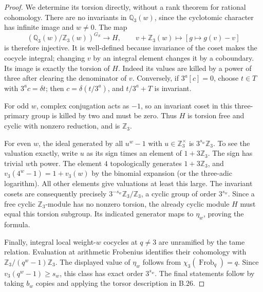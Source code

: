 \begin{proof}
We determine its torsion directly, without a rank
theorem for rational cohomology. There are no
invariants in $\mathbb Q_3(w)$, since the cyclotomic
character has infinite image and $w\ne0$. The map
\[
 (\mathbb Q_3(w)/\mathbb Z_3(w))^{G_S}
   \longrightarrow H,\qquad
 v+\mathbb Z_3(w)\longmapsto[g\mapsto g(v)-v]
\]
is therefore injective. It is well-defined because
invariance of the coset makes the cocycle integral;
changing $v$ by an integral element changes it by a
coboundary. Its image is exactly the torsion of $H$.
Indeed its values are killed by a power of three
after clearing the denominator of $v$. Conversely,
if $3^a[c]=0$, choose $t\in T$ with
$3^ac=\delta t$; then
$c=\delta(t/3^a)$, and $t/3^a+T$ is invariant.

For odd $w$, complex conjugation acts as $-1$,
so an invariant coset in this three-primary group
is killed by two and must be zero. Thus $H$ is
torsion free and cyclic with nonzero reduction,
and is $\mathbb Z_3$.

For even $w$, the ideal generated by all
$u^w-1$ with $u\in\mathbb Z_3^\times$ is
$3^{s_w}\mathbb Z_3$. To see the valuation exactly,
write $u$ as its sign times an element of
$1+3\mathbb Z_3$. The sign has trivial $w$th
power. The element $4$ topologically generates
$1+3\mathbb Z_3$, and
$v_3(4^w-1)=1+v_3(w)$ by the binomial expansion
(or the three-adic logarithm). All other elements
give valuations at least this large.
The invariant cosets are consequently precisely
$3^{-s_w}\mathbb Z_3/\mathbb Z_3$, a cyclic group
of order $3^{s_w}$. Since a free cyclic
$\mathbb Z_3$-module has no nonzero torsion, the
already cyclic module $H$ must equal this torsion
subgroup. Its indicated generator maps to
$\eta_w$, proving the formula.

Finally, integral local weight-$w$ cocycles at
$q\ne3$ are unramified by the tame relation.
Evaluation at arithmetic Frobenius identifies their
cohomology with
$\mathbb Z_3/(q^w-1)\mathbb Z_3$.
The displayed value of $\eta_w$ follows from
$\chi_3(\operatorname{Frob}_q)=q$.
Since $v_3(q^w-1)\geq s_w$, this class has
exact order $3^{s_w}$. The final statements
follow by taking $b_w$ copies and applying
the torsor description in B.26.
\end{proof}

